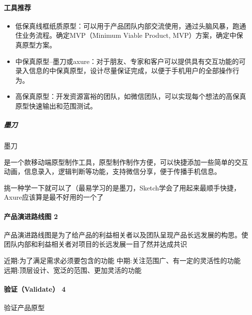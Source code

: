 \documentclass[letterpaper,11pt,english]{sphinxmanual}
\begin{document}
\paragraph{工具推荐}
\label{\detokenize{chapter_skill/prototype_design:id6}}\begin{itemize}
\item {} 
低保真\sphinxhyphen{}线框\sphinxhyphen{}纸质原型：可以用于产品团队内部交流使用，通过头脑风暴，跑通住业务流程。确定MVP（Minimum
Viable Product, MVP）方案，确定中保真原型方案。

\item {} 
中保真原型–墨刀或axure：对于朋友、专家和客户可以提供具有交互功能的可录入信息的中保真原型，设计尽量保证完成，以便于手机用户的全部操作行为。

\item {} 
高保真原型：开发资源富裕的团队，如微信团队，可以实现每个想法的高保真原型快速输出和范围测试。

\end{itemize}


\subparagraph{墨刀}
\label{\detokenize{chapter_skill/prototype_design:id7}}
墨刀%
\begin{footnote}[186]\sphinxAtStartFootnote
{}
%
\end{footnote}是一个款移动端原型制作工具，原型制作制作方便，可以快捷添加一些简单的交互动画，信息录入，逻辑判断等功能，支持微信分享，便于传播手机信息。

挑一种学一下就可以了（最易学习的是墨刀，Sketch学会了用起来最顺手快捷，Axure应该算是最不好用的一个了


\paragraph{产品演进路线图 2\sphinxfootnotemark[187]}
\label{\detokenize{chapter_skill/prototype_design:id8}}%
\begin{footnotetext}[187]\sphinxAtStartFootnote
{}
%
\end{footnotetext}\ignorespaces 
产品演进路线图是为了给产品的利益相关者以及团队呈现产品长远发展的构思。使团队内部和利益相关者对项目的长远发展一目了然并达成共识

近期:为了满足需求必须要包含的功能 中期:关注范围广、有一定的灵活性的功能
远期:顶层设计、宽泛的范围、更加灵活的功能


\paragraph{验证（Validate） 4\sphinxfootnotemark[188]}
\label{\detokenize{chapter_skill/prototype_design:validate-4}}%
\begin{footnotetext}[188]\sphinxAtStartFootnote
{}
%
\end{footnotetext}\ignorespaces 
验证产品原型
\end{document}
